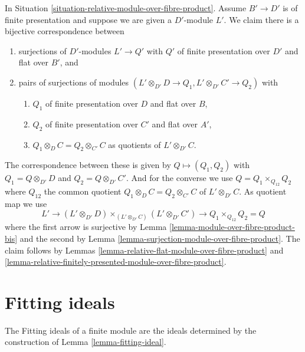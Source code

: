 \begin{remark}
\label{remark-relative-modules-over-fibre-product}
In Situation \ref{situation-relative-module-over-fibre-product}.
Assume $B' \to D'$ is of finite presentation and
suppose we are given a $D'$-module $L'$.
We claim there is a bijective correspondence between
\begin{enumerate}
\item surjections of $D'$-modules $L' \to Q'$ with $Q'$ of finite presentation
over $D'$ and flat over $B'$, and
\item pairs of surjections of modules
$(L' \otimes_{D'} D \to Q_1, L' \otimes_{D'} C' \to Q_2)$
with
\begin{enumerate}
\item $Q_1$ of finite presentation over $D$ and flat over $B$,
\item $Q_2$ of finite presentation over $C'$ and flat over $A'$,
\item $Q_1 \otimes_D C = Q_2 \otimes_{C'} C$ as quotients of
$L' \otimes_{D'} C$.
\end{enumerate}
\end{enumerate}
The correspondence between these is given by $Q \mapsto (Q_1, Q_2)$ with
$Q_1 = Q \otimes_{D'} D$ and $Q_2 = Q \otimes_{D'} C'$. And for the converse
we use $Q = Q_1 \times_{Q_{12}} Q_2$ where $Q_{12}$ the common quotient
$Q_1 \otimes_D C = Q_2 \otimes_{C'} C$ of $L' \otimes_{D'} C$. As quotient
map we use
$$
L' \longrightarrow
(L' \otimes_{D'} D) \times_{(L' \otimes_{D'} C)} (L' \otimes_{D'} C')
\longrightarrow Q_1 \times_{Q_{12}} Q_2 = Q
$$
where the first arrow is surjective by
Lemma \ref{lemma-module-over-fibre-product-bis}
and the second by Lemma \ref{lemma-surjection-module-over-fibre-product}.
The claim follows by
Lemmas \ref{lemma-relative-flat-module-over-fibre-product} and
\ref{lemma-relative-finitely-presented-module-over-fibre-product}.
\end{remark}








\section{Fitting ideals}
\label{section-fitting-ideals}

\noindent
The Fitting ideals of a finite module are the ideals determined
by the construction of Lemma \ref{lemma-fitting-ideal}.

